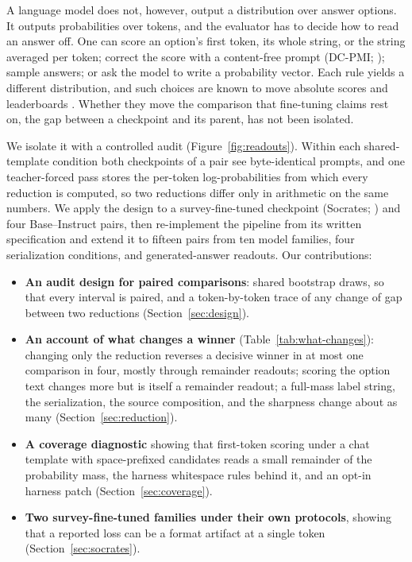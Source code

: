 \documentclass[11pt]{article}
\begin{document}
A language model does not, however, output a distribution over answer
options. It outputs probabilities over tokens, and the evaluator has to decide
how to read an answer off. One can score an option's first token, its whole string, or the string averaged per token; correct the score with a content-free prompt (DC-PMI; \citealp{holtzman-etal-2021-surface}); sample answers; or ask the model to write a probability vector. Each rule yields a different distribution, and such choices are known to move absolute scores and leaderboards \cite{shen-etal-2025-revisiting,tsvilodub2024predictions,lyu-etal-2024-beyond}. Whether they move the comparison that fine-tuning claims rest on, the gap between a checkpoint and its parent, has not been isolated.

We isolate it with a controlled audit (Figure~\ref{fig:readouts}). Within each shared-template condition both checkpoints of a pair see byte-identical prompts, and one teacher-forced pass stores the per-token log-probabilities from which every reduction is computed, so two reductions differ only in arithmetic on the same numbers. We apply the design to a survey-fine-tuned checkpoint (Socrates; \citealp{kolluri-etal-2025-finetuning}) and four Base--Instruct pairs, then re-implement the pipeline from its written specification and extend it to fifteen pairs from ten model families, four serialization conditions, and generated-answer readouts. Our contributions:
\begin{itemize}[leftmargin=*,itemsep=1pt,topsep=2pt]
\item \textbf{An audit design for paired comparisons}: shared bootstrap draws, so that every interval is paired, and a token-by-token trace of any change of gap between two reductions (Section~\ref{sec:design}).
\item \textbf{An account of what changes a winner} (Table~\ref{tab:what-changes}): changing only the reduction reverses a decisive winner in at most one comparison in four, mostly through remainder readouts; scoring the option text changes more but is itself a remainder readout; a full-mass label string, the serialization, the source composition, and the sharpness change about as many (Section~\ref{sec:reduction}).
\item \textbf{A coverage diagnostic} showing that first-token scoring under a chat template with space-prefixed candidates reads a small remainder of the probability mass, the harness whitespace rules behind it, and an opt-in harness patch (Section~\ref{sec:coverage}).
\item \textbf{Two survey-fine-tuned families under their own protocols}, showing that a reported loss can be a format artifact at a single token (Section~\ref{sec:socrates}).
\end{itemize}
\end{document}
